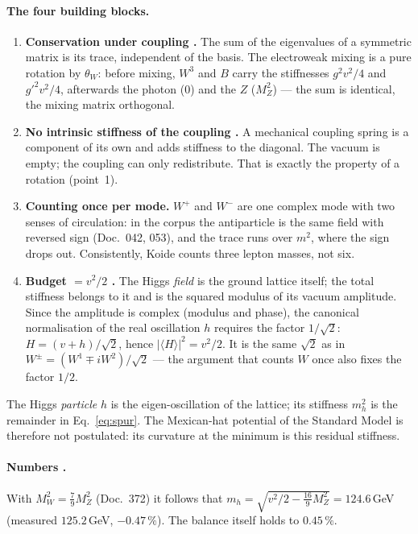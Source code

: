 \paragraph{The four building blocks.}
\begin{enumerate}
\item \textbf{Conservation under coupling \BM.} The sum of the eigenvalues
  of a symmetric matrix is its trace, independent of the basis. The
  electroweak mixing is a pure rotation by $\theta_W$: before mixing, $W^3$
  and $B$ carry the stiffnesses $g^2v^2/4$ and $g'^2v^2/4$, afterwards the
  photon ($0$) and the $Z$ ($M_Z^2$) --- the sum is identical, the mixing
  matrix orthogonal.
\item \textbf{No intrinsic stiffness of the coupling \BM.} A mechanical
  coupling spring is a component of its own and adds stiffness to the
  diagonal. The vacuum is empty; the coupling can only redistribute. That is
  exactly the property of a rotation (point~1).
\item \textbf{Counting once per mode.} $W^+$ and $W^-$ are one complex mode
  with two senses of circulation: in the corpus the antiparticle is the same
  field with reversed sign (Doc.~042, 053), and the trace runs over $m^2$,
  where the sign drops out. Consistently, Koide counts three lepton masses,
  not six.
\item \textbf{Budget $= v^2/2$ \BM.} The Higgs \emph{field} is the ground
  lattice itself; the total stiffness belongs to it and is the squared
  modulus of its vacuum amplitude. Since the amplitude is complex (modulus
  and phase), the canonical normalisation of the real oscillation $h$
  requires the factor $1/\sqrt2$: $H = (v+h)/\sqrt2$, hence
  $|\langle H\rangle|^2 = v^2/2$. It is the same $\sqrt2$ as in
  $W^\pm = (W^1\mp iW^2)/\sqrt2$ --- the argument that counts $W$ once also
  fixes the factor $1/2$.
\end{enumerate}
The Higgs \emph{particle} $h$ is the eigen-oscillation of the lattice; its
stiffness $m_h^2$ is the remainder in Eq.~\eqref{eq:spur}. The
Mexican-hat potential of the Standard Model is therefore not postulated:
its curvature at the minimum is this residual stiffness.

\paragraph{Numbers \KM.}
With $M_W^2 = \tfrac79 M_Z^2$ (Doc.~372) it follows that
$m_h = \sqrt{v^2/2 - \tfrac{16}{9}M_Z^2} = 124.6$\,GeV
(measured $125.2$\,GeV, $-0.47\,\%$). The balance itself holds to
$0.45\,\%$.

